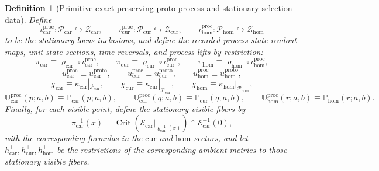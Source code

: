 \documentclass[11pt]{article}
\newcommand{\TensorProcSpace}{\mathcal P_{\mathrm{car}}}
\newcommand{\CurProcSpace}{\mathcal P_{\mathrm{cur}}}
\newcommand{\HomProcSpace}{\mathcal P_{\mathrm{hom}}}
\newcommand{\TensorProcRead}{\pi_{\mathrm{car}}}
\newcommand{\CurProcRead}{\pi_{\mathrm{cur}}}
\newcommand{\HomProcRead}{\pi_{\mathrm{hom}}}
\newcommand{\TensorProcUnit}{u_{\mathrm{car}}^{\mathrm{proc}}}
\newcommand{\CurProcUnit}{u_{\mathrm{cur}}^{\mathrm{proc}}}
\newcommand{\HomProcUnit}{u_{\mathrm{hom}}^{\mathrm{proc}}}
\newcommand{\TensorProcTimeRev}{\chi_{\mathrm{car}}}
\newcommand{\CurProcTimeRev}{\chi_{\mathrm{cur}}}
\newcommand{\HomProcTimeRev}{\chi_{\mathrm{hom}}}
\newcommand{\TensorProcMetric}{h_{\mathrm{car}}^{\perp}}
\newcommand{\CurProcMetric}{h_{\mathrm{cur}}^{\perp}}
\newcommand{\HomProcMetric}{h_{\mathrm{hom}}^{\perp}}
\newcommand{\TensorProcLift}{\mathbb U_{\mathrm{car}}^{\mathrm{proc}}}
\newcommand{\CurProcLift}{\mathbb U_{\mathrm{cur}}^{\mathrm{proc}}}
\newcommand{\HomProcLift}{\mathbb U_{\mathrm{hom}}^{\mathrm{proc}}}
\newcommand{\TensorProtoSpace}{\mathcal Z_{\mathrm{car}}}
\newcommand{\CurProtoSpace}{\mathcal Z_{\mathrm{cur}}}
\newcommand{\HomProtoSpace}{\mathcal Z_{\mathrm{hom}}}
\newcommand{\TensorProtoRead}{\varrho_{\mathrm{car}}}
\newcommand{\CurProtoRead}{\varrho_{\mathrm{cur}}}
\newcommand{\HomProtoRead}{\varrho_{\mathrm{hom}}}
\newcommand{\TensorProtoUnit}{u_{\mathrm{car}}^{\mathrm{proto}}}
\newcommand{\CurProtoUnit}{u_{\mathrm{cur}}^{\mathrm{proto}}}
\newcommand{\HomProtoUnit}{u_{\mathrm{hom}}^{\mathrm{proto}}}
\newcommand{\TensorProtoTimeRev}{\kappa_{\mathrm{car}}}
\newcommand{\CurProtoTimeRev}{\kappa_{\mathrm{cur}}}
\newcommand{\HomProtoTimeRev}{\kappa_{\mathrm{hom}}}
\newcommand{\TensorSelection}{\mathscr E_{\mathrm{car}}}
\newcommand{\TensorProtoTransport}{\mathbb P_{\mathrm{car}}}
\newcommand{\CurProtoTransport}{\mathbb P_{\mathrm{cur}}}
\newcommand{\HomProtoTransport}{\mathbb P_{\mathrm{hom}}}
\newcommand{\TensorProcInc}{\iota_{\mathrm{car}}^{\mathrm{proc}}}
\newcommand{\CurProcInc}{\iota_{\mathrm{cur}}^{\mathrm{proc}}}
\newcommand{\HomProcInc}{\iota_{\mathrm{hom}}^{\mathrm{proc}}}
\newcommand{\Crit}{\operatorname{Crit}}
\newtheorem{definition}{Definition}
\begin{document}
\begin{definition}[Primitive exact-preserving proto-process and stationary-selection data]
Define
\begin{equation}
\TensorProcInc:\TensorProcSpace\hookrightarrow\TensorProtoSpace,\qquad
\CurProcInc:\CurProcSpace\hookrightarrow\CurProtoSpace,\qquad
\HomProcInc:\HomProcSpace\hookrightarrow\HomProtoSpace
\label{eq:proc_inclusions}
\end{equation}
to be the stationary-locus inclusions, and define the recorded process-state readout maps, unit-state sections, time reversals, and process lifts by restriction:
\begin{equation}
\TensorProcRead\equiv \TensorProtoRead\circ\TensorProcInc,\qquad
\CurProcRead\equiv \CurProtoRead\circ\CurProcInc,\qquad
\HomProcRead\equiv \HomProtoRead\circ\HomProcInc,
\label{eq:proc_read_from_proto}
\end{equation}
\begin{equation}
\TensorProcUnit\equiv \TensorProtoUnit,\qquad
\CurProcUnit\equiv \CurProtoUnit,\qquad
\HomProcUnit\equiv \HomProtoUnit,
\label{eq:proc_units_from_proto}
\end{equation}
\begin{equation}
\TensorProcTimeRev\equiv \TensorProtoTimeRev|_{\TensorProcSpace},\qquad
\CurProcTimeRev\equiv \CurProtoTimeRev|_{\CurProcSpace},\qquad
\HomProcTimeRev\equiv \HomProtoTimeRev|_{\HomProcSpace},
\label{eq:proc_time_rev_from_proto}
\end{equation}
\begin{equation}
\TensorProcLift(p;a,b)\equiv\TensorProtoTransport(p;a,b),\qquad
\CurProcLift(q;a,b)\equiv\CurProtoTransport(q;a,b),\qquad
\HomProcLift(r;a,b)\equiv\HomProtoTransport(r;a,b).
\label{eq:proc_lift_from_proto}
\end{equation}
Finally, for each visible point, define the stationary visible fibers by
\begin{equation}
\TensorProcRead^{-1}(x)
=
\Crit\!\left(\TensorSelection|_{\TensorProtoRead^{-1}(x)}\right)\cap \TensorSelection^{-1}(0),
\label{eq:proc_fiber_from_proto_car}
\end{equation}
with the corresponding formulas in the \(\mathrm{cur}\) and \(\mathrm{hom}\) sectors, and let \(\TensorProcMetric,\CurProcMetric,\HomProcMetric\) be the restrictions of the corresponding ambient metrics to those stationary visible fibers.
\end{definition}
\end{document}
